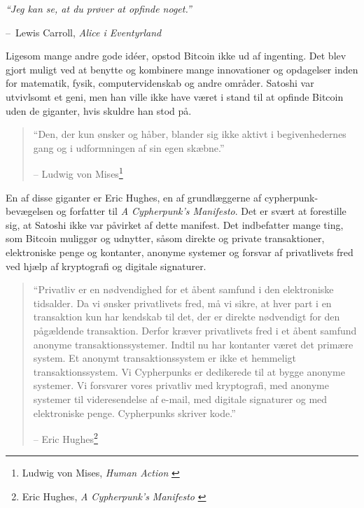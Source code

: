 \documentclass[paper=6in:9in,pagesize=pdftex,
               headinclude=on,footinclude=on,12pt]{scrbook}
\makeatletter
\newenvironment{chapquote}[2][4em]{\setlength{\@tempdima}{#1}%
   \def\chapquote@author{#2}%
   \parshape 1 \@tempdima \dimexpr\textwidth-2\@tempdima\relax%
   \itshape}{\par\normalfont\hfill--\ \chapquote@author\hspace*{\@tempdima}\par\bigskip}
\makeatother
\begin{document}
\begin{chapquote}{Lewis Carroll, \textit{Alice i Eventyrland}} \enquote{Jeg kan se, at du prøver at opfinde noget.} \end{chapquote}

Ligesom mange andre gode id\'eer, opstod Bitcoin ikke ud af ingenting. Det blev gjort muligt ved at benytte og kombinere mange innovationer og opdagelser inden for matematik, fysik, computervidenskab og andre områder. Satoshi var utvivlsomt et geni, men han ville ikke have været i stand til at opfinde Bitcoin uden de giganter, hvis skuldre han stod på.\begin{quotation}\begin{samepage} \enquote{Den, der kun ønsker og håber, blander sig ikke aktivt i begivenhedernes gang og i udformningen af sin egen skæbne.} \begin{flushright} -- Ludwig von Mises\footnote{Ludwig von Mises, \textit{Human Action} \cite{human-action}}
\end{flushright}\end{samepage}\end{quotation}%

En af disse giganter er Eric Hughes, en af grundlæggerne af cypherpunk-bevægelsen og forfatter til \textit{A Cypherpunk's Manifesto}. Det er svært at forestille sig, at Satoshi ikke var påvirket af dette manifest. Det indbefatter mange ting, som Bitcoin muliggør og udnytter, såsom direkte og private transaktioner, elektroniske penge og kontanter, anonyme systemer og forsvar af privatlivets fred ved hjælp af kryptografi og digitale signaturer.\begin{quotation}\begin{samepage} \enquote{Privatliv er en nødvendighed for et åbent samfund i den elektroniske tidsalder. \href{...}{} Da vi ønsker privatlivets fred, må vi sikre, at hver part i en transaktion kun har kendskab til det, der er direkte nødvendigt for den pågældende transaktion. \href{...}{} Derfor kræver privatlivets fred i et åbent samfund anonyme transaktionssystemer. Indtil nu har kontanter været det primære system. Et anonymt transaktionssystem er ikke et hemmeligt transaktionssystem. \href{...}{} Vi Cypherpunks er dedikerede til at bygge anonyme systemer. Vi forsvarer vores privatliv med kryptografi, med anonyme systemer til videresendelse af e-mail, med digitale signaturer og med elektroniske penge. Cypherpunks skriver kode.} \begin{flushright} -- Eric Hughes\footnote{Eric Hughes, \textit{A Cypherpunk's Manifesto} \cite{cypherpunk-manifesto}}
\end{flushright}\end{samepage}\end{quotation}
\end{document}
